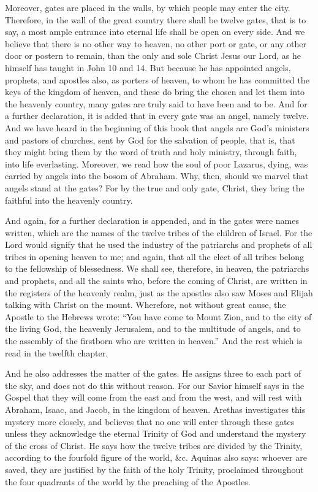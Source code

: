 Moreover, gates are placed in the walls, by which people may enter the city. Therefore, in the wall of the great country there shall be twelve gates, that is to say, a most ample entrance into eternal life shall be open on every side. And we believe that there is no other way to heaven, no other port or gate, or any other door or postern to remain, than the only and sole Christ Jesus our Lord, as he himself has taught in John 10 and 14. But because he has appointed angels, prophets, and apostles also, as porters of heaven, to whom he has committed the keys of the kingdom of heaven, and these do bring the chosen and let them into the heavenly country, many gates are truly said to have been and to be. And for a further declaration, it is added that in every gate was an angel, namely twelve. And we have heard in the beginning of this book that angels are God’s ministers and pastors of churches, sent by God for the salvation of people, that is, that they might bring them by the word of truth and holy ministry, through faith, into life everlasting. Moreover, we read how the soul of poor Lazarus, dying, was carried by angels into the bosom of Abraham. Why, then, should we marvel that angels stand at the gates? For by the true and only gate, Christ, they bring the faithful into the heavenly country.

And again, for a further declaration is appended, and in the gates were names written, which are the names of the twelve tribes of the children of Israel. For the Lord would signify that he used the industry of the patriarchs and prophets of all tribes in opening heaven to me; and again, that all the elect of all tribes belong to the fellowship of blessedness. We shall see, therefore, in heaven, the patriarchs and prophets, and all the saints who, before the coming of Christ, are written in the registers of the heavenly realm, just as the apostles also saw Moses and Elijah talking with Christ on the mount. Wherefore, not without great cause, the Apostle to the Hebrews wrote: “You have come to Mount Zion, and to the city of the living God, the heavenly Jerusalem, and to the multitude of angels, and to the assembly of the firstborn who are written in heaven.” And the rest which is read in the twelfth chapter.

And he also addresses the matter of the gates. He assigns three to each part of the sky, and does not do this without reason. For our Savior himself says in the Gospel that they will come from the east and from the west, and will rest with Abraham, Isaac, and Jacob, in the kingdom of heaven. Arethas investigates this mystery more closely, and believes that no one will enter through these gates unless they acknowledge the eternal Trinity of God and understand the mystery of the cross of Christ. He says how the twelve tribes are divided by the Trinity, according to the fourfold figure of the world, \&c. Aquinas also says: whoever are saved, they are justified by the faith of the holy Trinity, proclaimed throughout the four quadrants of the world by the preaching of the Apostles.

